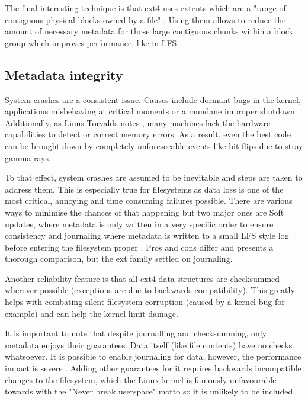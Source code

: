             The final interesting technique is that ext4 uses extents which are
            a "range of contiguous physical blocks owned by a file"
            \cite{ext4_space_maps}. Using them allows to reduce the amount of
            necessary metadata for those large contiguous chunks within a block
            group which improves performance, like in \hyperref[sec:LFS]{LFS}.

        \subsection{Metadata integrity}

            System crashes are a consistent issue. Causes include dormant bugs
            in the kernel, applications misbehaving at critical moments or a
            mundane improper shutdown. Additionally, as Linus
            Torvalds notes \cite{Linus_ECC_rant}, many machines lack the
            hardware capabilities to detect or correct memory errors. As a result, even the best
            code can be brought down by completely unforeseeable events like bit
            flips due to stray gamma rays.

            To that effect, system crashes are assumed to be inevitable and
            steps are taken to address them. This is especially true for
            filesystems as data loss is one of the most critical, annoying and
            time consuming failures possible. There are various ways to
            minimise the chances of that happening but two major ones are Soft
            updates, where metadata is only written in a very specific order to
            ensure consistency \cite{soft_updates} and journaling where
            metadata is written to a small LFS style log before entering the
            filesystem proper \cite{ext4_docs}. Pros and cons differ and
             presents a thorough
            comparison, but the ext family settled on journaling.

            Another reliability feature is that all ext4 data structures are
            checksummed wherever possible (exceptions are due to backwards
            compatibility). This greatly helps with combating silent
            filesystem corruption (caused by a kernel bug for example)
            and can help the kernel limit damage.

            It is important to note that despite journalling and checksumming,
            only metadata enjoys their guarantees. Data itself (like file
            contents) have no checks whatsoever. It is possible to enable
            journaling for data, however, the performance impact is severe
            \cite{ext4_docs}. Adding other guarantees for it requires backwards
            incompatible changes to the filesystem, which the Linux kernel is
            famously unfavourable towards with the "Never break userspace"
            motto \cite{never_break_userspace} so it is unlikely to be included.

